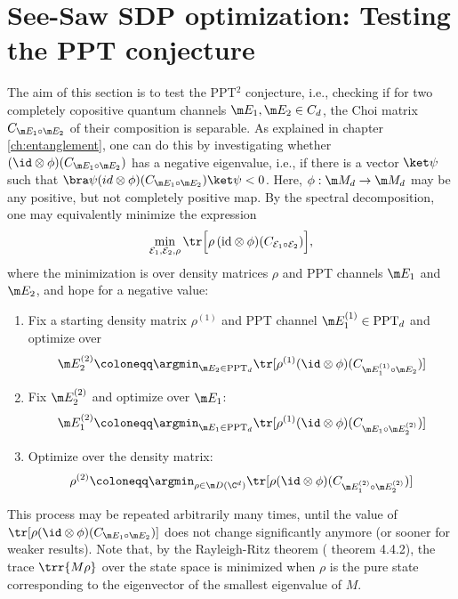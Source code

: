 \section{See-Saw SDP optimization: Testing the PPT conjecture}\label{ch:result-numerics}
The aim of this section is to test the PPT$^2$ conjecture, i.e., checking if for two completely copositive quantum channels $\m E_1, \m E_2 \in C_d$, the Choi matrix $C_{\m E_1\circ \m E_2}$ of their composition is separable. As explained in chapter \ref{ch:entanglement}, one can do this by investigating whether $(\id \otimes \phi)(C_{\m E_1\circ \m E_2})$ has a negative eigenvalue, i.e., if there is a vector $\ket \psi$ such that $\bra \psi (id \otimes \phi)(C_{\m E_1\circ \m E_2}) \ket \psi < 0$. Here, $\phi:\m M_d \rightarrow \m M_d$ may be any positive, but not completely positive map. By the spectral decomposition, one may equivalently minimize the expression
\begin{align}
    \min_{\mathcal{E}_1, \mathcal{E}_2, \rho} \tr \Big[ \rho \, (\text{id} \otimes \phi)(C_{\mathcal{E}_1 \circ \mathcal{E}_2}) \Big],
\end{align}
where the minimization is over density matrices $\rho$ and PPT channels $\m E_1$ and $\m E_2$, and hope for a negative value:
\begin{enumerate}
    \item Fix a starting density matrix $\rho^{(1)}$ and PPT channel $\m E_1^{(1)}\in \text{PPT}_d$ and optimize over
    \begin{align*}
        \m E_2^{(2)}\coloneqq \argmin_{\m E_2\in\text{PPT}_d}\tr[\rho^{(1)} (\id \otimes \phi)(C_{\m E_1^{(1)}\circ \m E_2})]
    \end{align*}
    \item Fix $\m E_2^{(2)}$ and optimize over $\m E_1$:
    \begin{align*}
        \m E_1^{(2)}\coloneqq \argmin_{\m E_1\in\text{PPT}_d}\tr[\rho^{(1)} (\id \otimes \phi)(C_{\m E_1\circ \m E_2^{(2)}})]
    \end{align*}
    \item Optimize over the density matrix: 
    \begin{align*}
        \rho^{(2)}\coloneqq \argmin_{\rho \in \m D(\C^d)}\tr[\rho (\id \otimes \phi)(C_{\m E_1^{(2)}\circ \m E_2^{(2)}})]
    \end{align*}
\end{enumerate}
This process may be repeated arbitrarily many times, until the value of $\tr[\rho (\id \otimes \phi)(C_{\m E_1\circ \m E_2})]$ does not change significantly anymore (or sooner for weaker results). Note that, by the Rayleigh-Ritz theorem (\cite{Horn2012} theorem 4.4.2), the trace $\trr{M \rho}$ over the state space is minimized when $\rho$ is the pure state corresponding to the eigenvector of the smallest eigenvalue of $M$.

